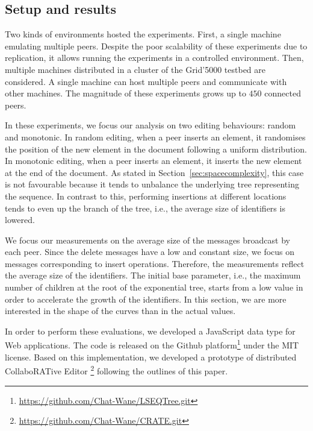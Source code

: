 \subsection{Setup and results}

Two kinds of environments hosted the experiments. First, a single machine
emulating multiple peers. Despite the poor scalability of these experiments due
to replication, it allows running the experiments in a controlled
environment. Then, multiple machines distributed in a cluster of the Grid'5000
testbed are considered. A single machine can host multiple peers and
communicate with other machines. The magnitude of these experiments grows up to
$450$ connected peers.

In these experiments, we focus our analysis on two editing behaviours: random
and monotonic. In random editing, when a peer inserts an element, it randomises
the position of the new element in the document following a uniform
distribution. In monotonic editing, when a peer inserts an element, it inserts
the new element at the end of the document. As stated in
Section~\ref{sec:spacecomplexity}, this case is not favourable because it tends
to unbalance the underlying tree representing the sequence. In contrast to
this, performing insertions at different locations tends to even up the branch
of the tree, i.e., the average size of identifiers is lowered.

We focus our measurements on the average size of the messages broadcast by each
peer. Since the delete messages have a low and constant size, we focus on
messages corresponding to insert operations. Therefore, the measurements
reflect the average size of the identifiers. The initial base parameter, i.e.,
the maximum number of children at the root of the exponential tree, starts from
a low value in order to accelerate the growth of the identifiers. In this
section, we are more interested in the shape of the curves than in the actual
values.

In order to perform these evaluations, we developed a JavaScript data type for
Web applications. The code is released on the Github
platform\footnote{\url{https://github.com/Chat-Wane/LSEQTree.git}} under the
MIT license. Based on this implementation, we developed a prototype of
distributed CollaboRATive Editor
\EDITORNAME{}\footnote{\url{https://github.com/Chat-Wane/CRATE.git}} following
the outlines of this paper.
\ \\

